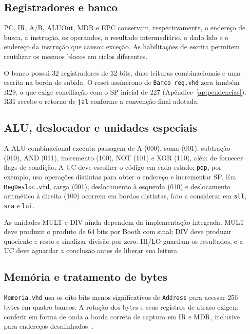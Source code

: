 \subsection{Registradores e banco}\label{subsec:registradores}

PC, IR, A/B, ALUOut, MDR e EPC conservam, respectivamente, o endereço de busca, a instrução, os operandos, o resultado intermediário, o dado lido e o endereço da instrução que causou exceção. As habilitações de escrita permitem reutilizar os mesmos blocos em ciclos diferentes.

O banco possui 32 registradores de 32 bits, duas leituras combinacionais e uma escrita na borda de subida. O reset assíncrono de \texttt{Banco\_reg.vhd} zera também R29, o que exige conciliação com o SP inicial de 227 (Apêndice~\ref{ap:pendencias}). R31 recebe o retorno de \texttt{jal} conforme a convenção final adotada.

\subsection{ALU, deslocador e unidades especiais}\label{subsec:alu}

A ALU combinacional executa passagem de A (000), soma (001), subtração (010), AND (011), incremento (100), NOT (101) e XOR (110), além de fornecer flags de condição. A UC deve escolher o código em cada estado; \texttt{pop}, por exemplo, usa operações distintas para obter o endereço e incrementar SP. Em \texttt{RegDesloc.vhd}, carga (001), deslocamento à esquerda (010) e deslocamento aritmético à direita (100) ocorrem em bordas distintas, fato a considerar em \texttt{sll}, \texttt{sra} e \texttt{lui}.

As unidades MULT e DIV ainda dependem da implementação integrada. MULT deve produzir o produto de 64 bits por Booth com sinal; DIV deve produzir quociente e resto e sinalizar divisão por zero. HI/LO guardam os resultados, e a UC deve aguardar a conclusão antes de liberar sua leitura.

\subsection{Memória e tratamento de bytes}\label{subsec:memoria}

\texttt{Memoria.vhd} usa os oito bits menos significativos de \texttt{Address} para acessar 256 bytes em quatro bancos. A rotação dos bytes e seus registros de atraso exigem conferir em forma de onda a borda correta de captura em IR e MDR, inclusive para endereços desalinhados~\cite{docpt3}.

